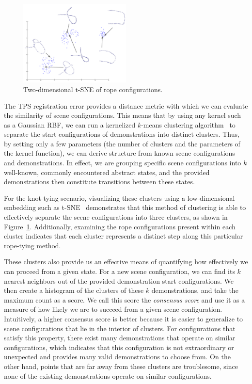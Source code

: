 \documentclass{article}
\begin{document}
\begin{figure}
\centering
\includegraphics[width=0.5\textwidth]{tsne_clusters}
\caption{Two-dimensional t-SNE of rope configurations.}
\label{fig:tsne_clusters}
\end{figure}

The TPS registration error provides a distance metric with which we can evaluate the similarity of scene configurations. This means that by using any kernel such as a Gaussian RBF, we can run a kernelized $k$-means clustering algorithm~\cite{Dhillon2004} to separate the start configurations of demonstrations into distinct clusters. Thus, by setting only a few parameters (the number of clusters and the parameters of the kernel function), we can derive structure from known scene configurations and demonstrations. In effect, we are grouping specific scene configurations into $k$ well-known, commonly encountered abstract states, and the provided demonstrations then constitute transitions between these states.

For the knot-tying scenario, visualizing these clusters using a low-dimensional embedding such as t-SNE~\cite{tSNE2008} demonstrates that this method of clustering is able to effectively separate the scene configurations into three clusters, as shown in Figure~\ref{fig:tsne_clusters}. Additionally, examining the rope configurations present within each cluster indicates that each cluster represents a distinct step along this particular rope-tying method.

These clusters also provide us an effective means of quantifying how effectively we can proceed from a given state. For a new scene configuration, we can find its $k$ nearest neighbors out of the provided demonstration start configurations. We then create a histogram of the clusters of these $k$ demonstrations, and take the maximum count as a score. We call this score the \emph{consensus score} and use it as a measure of how likely we are to succeed from a given scene configuration. Intuitively, a higher consensus score is better because it is easier to generalize to scene configurations that lie in the interior of clusters. For configurations that satisfy this property, there exist many demonstrations that operate on similar configurations, which indicates that this configuration is not extraordinary or unexpected and provides many valid demonstrations to choose from. On the other hand, points that are far away from these clusters are troublesome, since none of the existing demonstrations operate on similar configurations.
\end{document}
